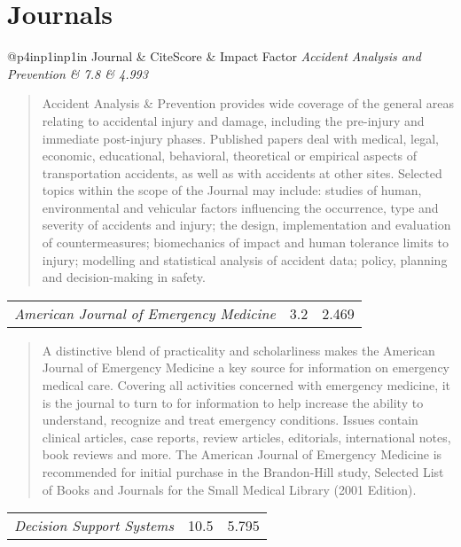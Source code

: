 \section{Journals}

\noindent\begin{tabular}{@{}p{4in}p{1in}p{1in}}
	Journal & CiteScore & Impact Factor \cr\hline
	\it Accident Analysis and Prevention & 7.8 & 4.993 \cr
\end{tabular}

\begin{quote}
Accident Analysis \& Prevention provides wide coverage of the general areas relating to accidental injury and damage, including the pre-injury and immediate post-injury phases. Published papers deal with medical, legal, economic, educational, behavioral, theoretical or empirical aspects of transportation accidents, as well as with accidents at other sites. Selected topics within the scope of the Journal may include: studies of human, environmental and vehicular factors influencing the occurrence, type and severity of accidents and injury; the design, implementation and evaluation of countermeasures; biomechanics of impact and human tolerance limits to injury; modelling and statistical analysis of accident data; policy, planning and decision-making in safety. 
\end{quote}

\noindent\begin{tabular}{@{}p{4in}p{1in}p{1in}}
	\it American Journal of Emergency Medicine & 3.2 & 2.469 \cr
\end{tabular}

	\begin{quote}
	A distinctive blend of practicality and scholarliness makes the American Journal of Emergency Medicine a key source for information on emergency medical care. Covering all activities concerned with emergency medicine, it is the journal to turn to for information to help increase the ability to understand, recognize and treat emergency conditions. Issues contain clinical articles, case reports, review articles, editorials, international notes, book reviews and more. The American Journal of Emergency Medicine is recommended for initial purchase in the Brandon-Hill study, Selected List of Books and Journals for the Small Medical Library (2001 Edition).
	\end{quote}

\noindent\begin{tabular}{@{}p{4in}p{1in}p{1in}}
	\it Decision Support Systems & 10.5 & 5.795 \cr
\end{tabular}

